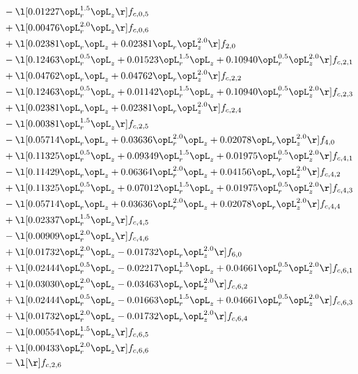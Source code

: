 \begin{alignat}{2}
& - \l[  0.01227 \opL_r^{1.5} \opL_z  \r] f_{c,0,5} \nonumber \\ 
& + \l[  0.00476 \opL_r^{2.0} \opL_z  \r] f_{c,0,6} \nonumber \\ 
& + \l[  0.02381 \opL_r \opL_z +  0.02381 \opL_r \opL_z^{2.0}  \r] f_{2,0} \nonumber \\ 
& - \l[  0.12463 \opL_r^{0.5} \opL_z +  0.01523 \opL_r^{1.5} \opL_z +  0.10940 \opL_r^{0.5} \opL_z^{2.0}  \r] f_{c,2,1} \nonumber \\ 
& + \l[  0.04762 \opL_r \opL_z +  0.04762 \opL_r \opL_z^{2.0}  \r] f_{c,2,2} \nonumber \\ 
& - \l[  0.12463 \opL_r^{0.5} \opL_z +  0.01142 \opL_r^{1.5} \opL_z +  0.10940 \opL_r^{0.5} \opL_z^{2.0}  \r] f_{c,2,3} \nonumber \\ 
& + \l[  0.02381 \opL_r \opL_z +  0.02381 \opL_r \opL_z^{2.0}  \r] f_{c,2,4} \nonumber \\ 
& - \l[  0.00381 \opL_r^{1.5} \opL_z  \r] f_{c,2,5} \nonumber \\ 
& - \l[  0.05714 \opL_r \opL_z +  0.03636 \opL_r^{2.0} \opL_z +  0.02078 \opL_r \opL_z^{2.0}  \r] f_{4,0} \nonumber \\ 
& + \l[  0.11325 \opL_r^{0.5} \opL_z +  0.09349 \opL_r^{1.5} \opL_z +  0.01975 \opL_r^{0.5} \opL_z^{2.0}  \r] f_{c,4,1} \nonumber \\ 
& - \l[  0.11429 \opL_r \opL_z +  0.06364 \opL_r^{2.0} \opL_z +  0.04156 \opL_r \opL_z^{2.0}  \r] f_{c,4,2} \nonumber \\ 
& + \l[  0.11325 \opL_r^{0.5} \opL_z +  0.07012 \opL_r^{1.5} \opL_z +  0.01975 \opL_r^{0.5} \opL_z^{2.0}  \r] f_{c,4,3} \nonumber \\ 
& - \l[  0.05714 \opL_r \opL_z +  0.03636 \opL_r^{2.0} \opL_z +  0.02078 \opL_r \opL_z^{2.0}  \r] f_{c,4,4} \nonumber \\ 
& + \l[  0.02337 \opL_r^{1.5} \opL_z  \r] f_{c,4,5} \nonumber \\ 
& - \l[  0.00909 \opL_r^{2.0} \opL_z  \r] f_{c,4,6} \nonumber \\ 
& + \l[  0.01732 \opL_r^{2.0} \opL_z   -0.01732 \opL_r \opL_z^{2.0}  \r] f_{6,0} \nonumber \\ 
& + \l[  0.02444 \opL_r^{0.5} \opL_z   -0.02217 \opL_r^{1.5} \opL_z +  0.04661 \opL_r^{0.5} \opL_z^{2.0}  \r] f_{c,6,1} \nonumber \\ 
& + \l[  0.03030 \opL_r^{2.0} \opL_z   -0.03463 \opL_r \opL_z^{2.0}  \r] f_{c,6,2} \nonumber \\ 
& + \l[  0.02444 \opL_r^{0.5} \opL_z   -0.01663 \opL_r^{1.5} \opL_z +  0.04661 \opL_r^{0.5} \opL_z^{2.0}  \r] f_{c,6,3} \nonumber \\ 
& + \l[  0.01732 \opL_r^{2.0} \opL_z   -0.01732 \opL_r \opL_z^{2.0}  \r] f_{c,6,4} \nonumber \\ 
& - \l[  0.00554 \opL_r^{1.5} \opL_z  \r] f_{c,6,5} \nonumber \\ 
& + \l[  0.00433 \opL_r^{2.0} \opL_z  \r] f_{c,6,6} \nonumber \\ 
& - \l[  \r] f_{c,2,6} \nonumber \\ 
\end{alignat} 


